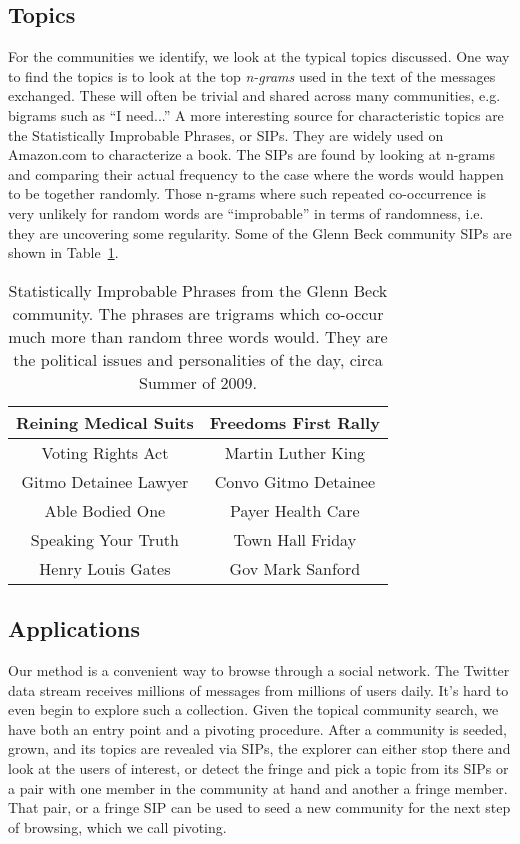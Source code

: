 \subsection{Topics}

For the communities we identify, we look at the typical topics discussed.  One way to find the topics is to look at the top \emph{n-grams} \cite{Ngram:Chen-Goodman} used in the text of the messages exchanged.  These will often be trivial and shared across many communities, e.g. bigrams such as ``I need...''  A more interesting source for characteristic topics are the Statistically Improbable Phrases, or SIPs.  They are widely used on Amazon.com to characterize a book.  The SIPs are found by looking at n-grams and comparing their actual frequency to the case where the words would happen to be together randomly.  Those n-grams where such repeated co-occurrence is very unlikely for random words are ``improbable'' in terms of randomness, i.e. they are uncovering some regularity.  Some of the Glenn Beck community SIPs are shown in Table~\ref{table:gb-sips}.

\begin{table}
\label{table:gb-sips}
	\centering
\begin{tabular}{|c|c|}
	\hline
	Reining Medical Suits & Freedoms First Rally \\
	\hline
	Voting Rights Act & Martin Luther King \\
	\hline
	Gitmo Detainee Lawyer & Convo Gitmo Detainee \\
	\hline
	Able Bodied One & Payer Health Care \\
	\hline
	Speaking Your Truth & Town Hall Friday \\
	\hline
	Henry Louis Gates & Gov Mark Sanford \\
	\hline 
\end{tabular}
\caption{Statistically Improbable Phrases from the Glenn Beck community.  The phrases are trigrams which co-occur much more than random three words would.  They are the political issues and personalities of the day, circa Summer of 2009.}
\end{table}


\subsection{Applications}

Our method is a convenient way to browse through a social network.  The Twitter data stream receives millions of messages from millions of users daily.  It's hard to even begin to explore such a collection.  Given the topical community search, we have both an entry point and a pivoting procedure.  After a community is seeded, grown, and its topics are revealed via SIPs, the explorer can either stop there and look at the users of interest, or detect the fringe and pick a topic from its SIPs or a pair with one member in the community at hand and another a fringe member.  That pair, or a fringe SIP can be used to seed a new community for the next step of browsing, which we call pivoting.

